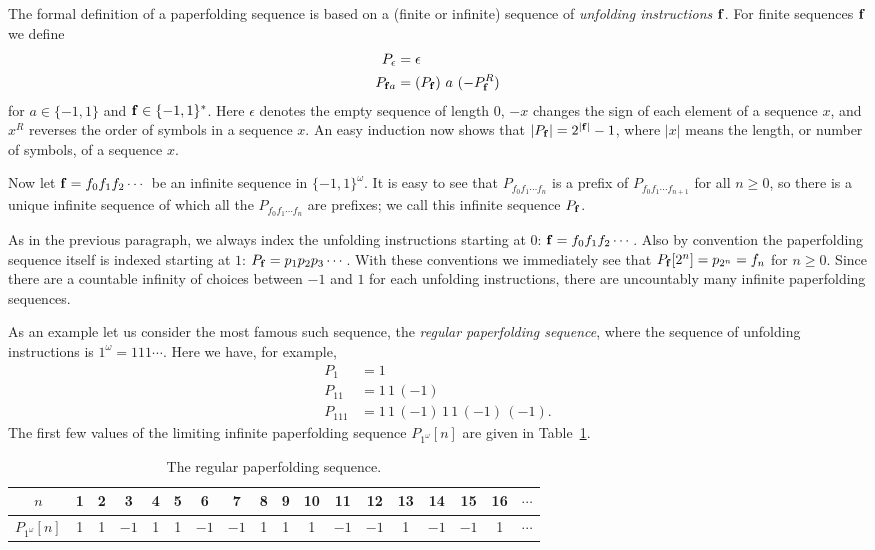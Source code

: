 \documentclass[12pt,reqno]{article}
\begin{document}
The formal definition of a paperfolding sequence is based on a
(finite or infinite) sequence of {\it unfolding instructions} $\bf f$.
For finite sequences $\bf f$ 
we define
\begin{align}
P_\epsilon &= \epsilon \nonumber\\
P_{{\bf f} a} &= (P_{\bf f}) \  a \ ({-P_{{\bf f}}^R}) \label{fund}
\end{align}
for $a \in \{ -1, 1\}$ and ${\bf f} \in \{-1, 1\}^*$.
Here $\epsilon$ denotes the empty sequence of length $0$,
$-x$ changes the sign of each element of a sequence $x$, and
$x^R$ reverses the order of symbols in a sequence $x$.
An easy induction now shows that $|P_{\bf f}| = 2^{|{\bf f}|} - 1$, where
$|x|$ means the length, or number of symbols, of a sequence $x$.

Now let ${\bf f} = f_0 f_1 f_2 \cdots$ be an infinite sequence in
$\{-1, 1\}^\omega$.  It is easy to see that 
$P_{f_0 f_1 \cdots f_n}$ is a prefix of
$P_{f_0 f_1 \cdots f_{n+1}}$ for all $n \geq 0$, so there is a unique
infinite sequence of which all the $P_{f_0 f_1 \cdots f_n}$
are prefixes; we call this infinite sequence $P_{\bf f}$.

As in the previous paragraph, 
we always index the unfolding instructions starting
at $0$:  ${\bf f} = f_0 f_1 f_2 \cdots$.  Also by convention the
paperfolding sequence itself is indexed starting at $1$:
$P_{\bf f} = p_1 p_2 p_3 \cdots$.
With these conventions we immediately see that $P_{\bf f} [2^n] = p_{2^n} = f_n$
for $n \geq 0$.  Since there are a countable infinity of choices 
between $-1$ and $1$ for each unfolding instructions, there are
uncountably many infinite paperfolding sequences.

As an example let us consider the most famous such sequence, the
{\it regular paperfolding sequence}, where the
sequence of unfolding instructions is $1^\omega = 111\cdots$.  
Here we have, for example,
\begin{align*}
P_1 &= 1 \\
P_{11} &= 1 \, 1 \, (-1) \\
P_{111} &= 1 \, 1 \, (-1) \, 1 \, 1 \, (-1) \, (-1) .
\end{align*}
The first few values of the limiting infinite paperfolding
sequence $P_{1^\omega} [n]$ are given in Table~\ref{tab1}.
\begin{table}[htb]
\begin{center}
\begin{tabular}{c|ccccccccccccccccc} 
$n$ & 1 & 2 &  3 & 4 & 5 & 6 & 7 & 8 & 9 & 10 & 11 & 12 & 13 & 14 & 15 & 16 & $\cdots$\\
\hline
$P_{1^\omega} [n]$ & 1& 1&$-1$& 1& 1&$-1$&$-1$& 1& 1& 1&$-1$&$-1$& 1&$-1$&$-1$ & 1& $\cdots$
\end{tabular}
\end{center}
\caption{The regular paperfolding sequence.}
\label{tab1}
\end{table}
\end{document}
